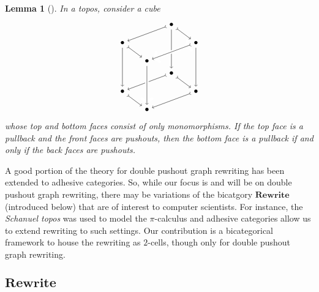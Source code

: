 \documentclass[11pt]{amsart}
\newcommand{\cat}[1]{\mathbf{#1}}
\newtheorem{lem}[thm]{Lemma}
\theoremstyle{remark}
\theoremstyle{definition}
\begin{document}
\begin{lem}[{\cite[Lemma 
		6.3]{LackSoboc_AdhesiveCategories}}] 
	\label{lem.vk dual}
	In a topos, consider a cube
	\[
	\begin{tikzpicture}
		\node (tb) at (2,2.75) {$\bullet$};
		\node (tl) at (0,2) {$\bullet$};
		\node (tr) at (3,2) {$\bullet$};
		\node (tf) at (1,1.25) {$\bullet$};
		\node (bb) at (2,0.75) {$\bullet$};
		\node (bl) at (0,0) {$\bullet$};
		\node (br) at (3,0) {$\bullet$};
		\node (bf) at (1,-.75) {$\bullet$};
		\draw [>->] (tb) edge (tr);
		\draw [->] (tb) edge (bb);
		\draw [>->] (tb) edge (tl);
		\draw [->] (tr) edge (br);
		\draw [>->] (tl) edge (tf);
		\draw [->] (tl) edge (bl);
		\draw [>->] (bb) edge (br);
		\draw [>->] (bb) edge (bl);
		\draw [>->] (br) edge (bf);
		\draw [>->] (bl) edge (bf);
		\draw [->] (tf) edge[white,line width=4pt] (bf);
		\draw [->] (tf) edge (bf);
		\draw [>->] (tr) edge[white,line width=4pt] (tf);
		\draw [>->] (tr) edge (tf);
	\end{tikzpicture}
	\]
	whose top and bottom faces consist of only monomorphisms. If the top face is a pullback 
	and the front faces are pushouts, then the bottom face is a pullback if and only if the 
	back faces are pushouts.
\end{lem}

A good portion of the theory for double pushout graph rewriting has been extended to adhesive categories. So, while our focus is and will be on double pushout graph rewriting, there may be variations of the bicatgory $\cat{Rewrite}$ (introduced below) that are of interest to computer scientists.  For instance, the \emph{Schanuel topos} was used to model the $\pi$-calculus \cite{Fiore_OpModelsProcessCalulii} and adhesive categories allow  us to extend rewriting to such settings.  Our contribution is a bicategorical framework to house the rewriting as $2$-cells, though only for double pushout graph rewriting.

\subsection{$\cat{Rewrite}$}  %
\label{sec.Rewrite}
\end{document}
